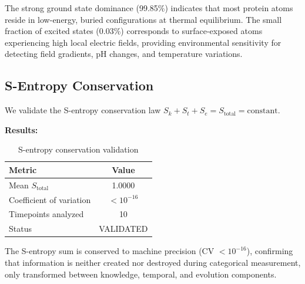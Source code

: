 \documentclass[twocolumn,10pt]{article}
\begin{document}
The strong ground state dominance (99.85\%) indicates that most protein atoms reside in low-energy, buried configurations at thermal equilibrium. The small fraction of excited states (0.03\%) corresponds to surface-exposed atoms experiencing high local electric fields, providing environmental sensitivity for detecting field gradients, pH changes, and temperature variations.

\subsection{S-Entropy Conservation}

We validate the S-entropy conservation law $S_k + S_t + S_e = S_{\text{total}} = \text{constant}$.

\textbf{Results:}
\begin{table}[H]
\centering
\caption{S-entropy conservation validation}
\begin{tabular}{@{}lc@{}}
\toprule
Metric & Value \\
\midrule
Mean $S_{\text{total}}$ & 1.0000 \\
Coefficient of variation & $< 10^{-16}$ \\
Timepoints analyzed & 10 \\
Status & VALIDATED \\
\bottomrule
\end{tabular}
\end{table}

The S-entropy sum is conserved to machine precision (CV $< 10^{-16}$), confirming that information is neither created nor destroyed during categorical measurement, only transformed between knowledge, temporal, and evolution components.
\end{document}
